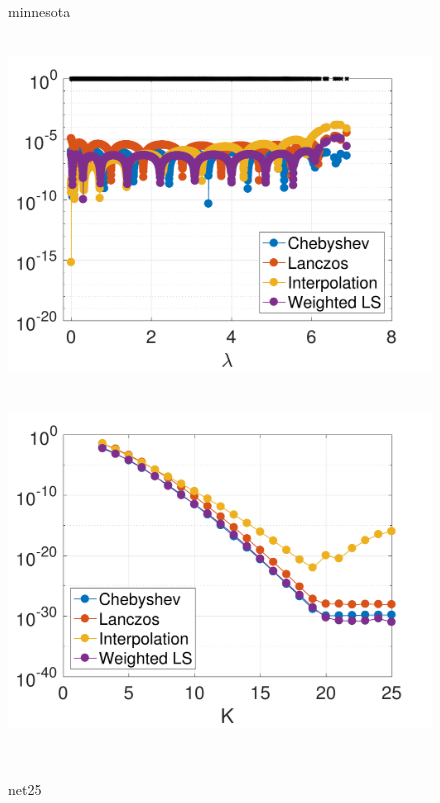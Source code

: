 \documentclass{article}
\begin{document}
\begin{figure}[bth]
\begin{minipage}[m]{0.44\linewidth}
\end{minipage}\\
\begin{minipage}[m]{0.1\linewidth}
\centerline{\small{minnesota}}
\end{minipage}
\begin{minipage}[m]{0.44\linewidth}
\centerline{~~\includegraphics[width=.95\linewidth]{fig_minnesota_deg10}}
\end{minipage}
\begin{minipage}[m]{0.44\linewidth}
\centerline{~~\includegraphics[width=.95\linewidth]{fig_minnesota_err_const_b}}
\end{minipage}\\
\begin{minipage}[m]{0.1\linewidth}
\centerline{\small{net25}}
\end{minipage}

\end{figure}
\end{document}

